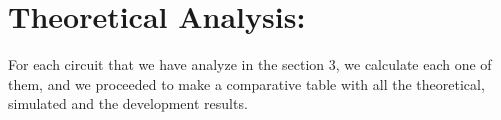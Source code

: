 \section{Theoretical Analysis:}

For each circuit that we have analyze in the section 3, we calculate each one of them, and we proceeded to make a comparative table with all the theoretical, simulated and the development results. \hfill \break
